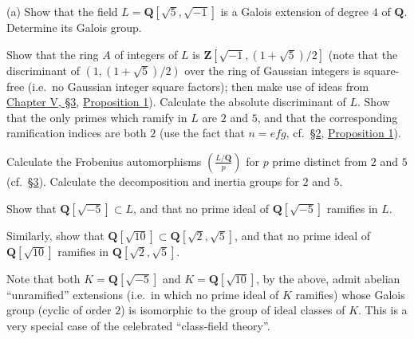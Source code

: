  (a) Show that the field
$L=\mathbf{Q}[\sqrt{5},\sqrt{-1}]$ is a Galois extension of degree $4$ of
$\mathbf{Q}$. Determine its Galois group.
\begin{alist}
\item Show that the ring $A$ of integers of $L$ is
$\mathbf{Z}[\sqrt{-1},(1+\sqrt{5})/2]$ (note that the discriminant of
$(1,(1+\sqrt{5})/2)$ over the ring of Gaussian integers is square-free
(i.e.\ no Gaussian integer square factors); then make use of ideas from
\hyperref[sec:5.3]{Chapter V, §3}, \hyperref[prop:V.3.1]{Proposition 1}). Calculate the absolute discriminant of $L$.
Show that the only primes which ramify in $L$ are $2$ and $5$, and that the
corresponding ramification indices are both $2$ (use the fact that $n=efg$,
cf.\ \hyperref[sec:6.2]{§2}, \hyperref[prop:VI.2.1]{Proposition 1}).
\item Calculate the Frobenius automorphisms
$\left(\frac{L/\mathbf{Q}}{p}\right)$ for $p$ prime distinct from $2$ and
$5$ (cf.\ \hyperref[sec:6.3]{§3}). Calculate the decomposition and inertia groups for $2$ and
$5$.
\item Show that $\mathbf{Q}[\sqrt{-5}]\subset L$, and that no prime ideal of
$\mathbf{Q}[\sqrt{-5}]$ ramifies in $L$.
\item Similarly, show that
$\mathbf{Q}[\sqrt{10}]\subset\mathbf{Q}[\sqrt{2},\sqrt{5}]$, and that no
prime ideal of $\mathbf{Q}[\sqrt{10}]$ ramifies in
$\mathbf{Q}[\sqrt{2},\sqrt{5}]$.
\end{alist}

Note that both $K=\mathbf{Q}[\sqrt{-5}]$ and $K=\mathbf{Q}[\sqrt{10}]$, by
the above, admit abelian ``unramified'' extensions (i.e.\ in which no prime
ideal of $K$ ramifies) whose Galois group (cyclic of order $2$) is
isomorphic to the group of ideal classes of $K$. This is a very special case
of the celebrated ``class-field theory''.

